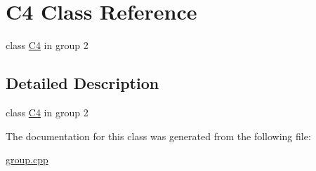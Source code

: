 \hypertarget{class_c4}{\section{C4 Class Reference}
\label{class_c4}
}


class \hyperlink{class_c4}{C4} in group 2  




\subsection{Detailed Description}
class \hyperlink{class_c4}{C4} in group 2 

The documentation for this class was generated from the following file\-:\begin{DoxyCompactItemize}
\item 
\hyperlink{group_8cpp}{group.\-cpp}\end{DoxyCompactItemize}
